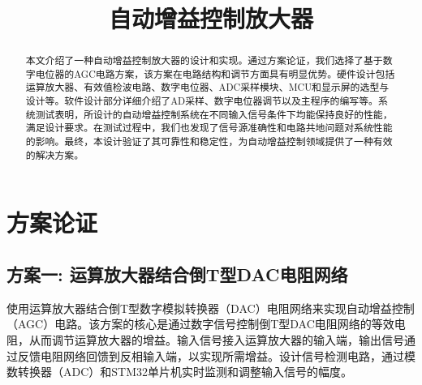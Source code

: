 \documentclass[lang=cn,11pt,a4paper]{elegantpaper}
\title{自动增益控制放大器}
\date{\zhtoday}
\begin{document}
\maketitle

\begin{abstract}
  本文介绍了一种自动增益控制放大器的设计和实现。通过方案论证，我们选择了基于数字电位器的AGC电路方案，该方案在电路结构和调节方面具有明显优势。硬件设计包括运算放大器、有效值检波电路、数字电位器、ADC采样模块、MCU和显示屏的选型与设计等。软件设计部分详细介绍了AD采样、数字电位器调节以及主程序的编写等。系统测试表明，所设计的自动增益控制系统在不同输入信号条件下均能保持良好的性能，满足设计要求。在测试过程中，我们也发现了信号源准确性和电路共地问题对系统性能的影响。最终，本设计验证了其可靠性和稳定性，为自动增益控制领域提供了一种有效的解决方案。
\end{abstract}

\section{方案论证}

\subsection{方案一: 运算放大器结合倒T型DAC电阻网络}

使用运算放大器结合倒T型数字模拟转换器（DAC）电阻网络来实现自动增益控制（AGC）电路。该方案的核心是通过数字信号控制倒T型DAC电阻网络的等效电阻，从而调节运算放大器的增益。输入信号接入运算放大器的输入端，输出信号通过反馈电阻网络回馈到反相输入端，以实现所需增益。设计信号检测电路，通过模数转换器（ADC）和STM32单片机实时监测和调整输入信号的幅度。
\end{document}
